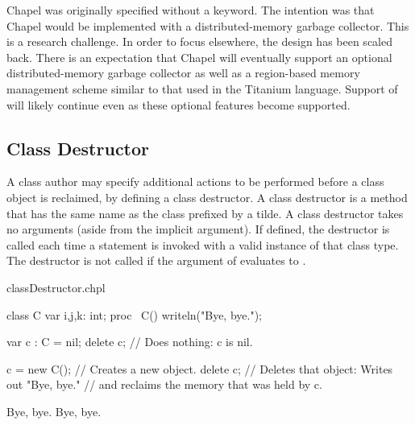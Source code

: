 \begin{openissue}
Chapel was originally specified without a  keyword.  The intention
was that Chapel would be implemented with a distributed-memory garbage
collector.  This is a research challenge.  In order to focus elsewhere, the
design has been scaled back.  There is an expectation that Chapel will
eventually support an optional distributed-memory garbage collector as well as
a region-based memory management scheme similar to that used in the Titanium
language.  Support of  will likely continue even as these optional
features become supported.
\end{openissue}


\subsection{Class Destructor}
\label{Class_Destructor}

A class author may specify additional actions to be performed before a class object is
reclaimed, by defining a class destructor.  A class destructor is a method that has the
same name as the class prefixed by a tilde.  A class destructor takes no arguments (aside from
the implicit  argument).  If defined, the destructor is called each time
a  statement is invoked with a valid instance of that class type.  The
destructor is not called if the argument of  evaluates to .

\begin{chapelexample}{classDestructor.chpl}
\begin{chapel}
class C {
  var i,j,k: int;
  proc ~C() { writeln("Bye, bye."); }
}

var c : C = nil;
delete c;        // Does nothing: c is nil.

c = new C();     // Creates a new object.
delete c;        // Deletes that object: Writes out "Bye, bye." 
                 // and reclaims the memory that was held by c.
\end{chapel}
\begin{chapeloutput}
Bye, bye.
Bye, bye.
\end{chapeloutput}
\end{chapelexample}
